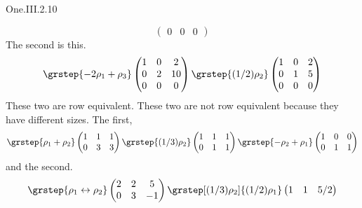 \begin{ans}{One.III.2.10}
\begin{exparts}
\begin{equation*}
\begin{pmatrix}
              0  &0  &0
            \end{pmatrix}
          \end{equation*}
          The second is this.
          \begin{equation*}
            \grstep{-2\rho_1+\rho_3}
            \begin{pmatrix}
              1  &0  &2  \\
              0  &2  &10 \\
              0  &0  &0
            \end{pmatrix}
            \grstep{(1/2)\rho_2}
            \begin{pmatrix}
              1  &0  &2  \\
              0  &1  &5  \\
              0  &0  &0
            \end{pmatrix}
          \end{equation*}
          These two are row equivalent.
        \partsitem These two are not row equivalent because they have different
          sizes.
        \partsitem The first,
          \begin{equation*}
            \grstep{\rho_1+\rho_2}
            \begin{pmatrix}
              1  &1  &1  \\
              0  &3  &3
            \end{pmatrix}
            \grstep{(1/3)\rho_2}
            \begin{pmatrix}
              1  &1  &1  \\
              0  &1  &1
            \end{pmatrix}
            \grstep{-\rho_2+\rho_1}
            \begin{pmatrix}
              1  &0  &0  \\
              0  &1  &1
            \end{pmatrix}
          \end{equation*}
          and the second.
          \begin{equation*}
            \grstep{\rho_1\leftrightarrow\rho_2}
            \begin{pmatrix}
              2  &2  &5  \\
              0  &3  &-1
            \end{pmatrix}
            \grstep[(1/3)\rho_2]{(1/2)\rho_1}
            \begin{pmatrix}
              1  &1  &5/2 \\

\end{pmatrix}
\end{equation*}
\end{exparts}
\end{ans}
